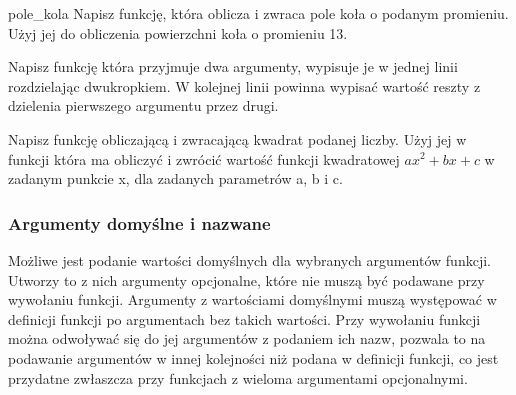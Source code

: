\documentclass{pdfBooklets}
\begin{document}
\begin{Zadanie}{}{pole_kola}
Napisz funkcję, która oblicza i zwraca pole koła o podanym promieniu. Użyj jej do obliczenia powierzchni koła o promieniu 13.

\end{Zadanie}

\begin{Zadanie}{}{}

Napisz funkcję która przyjmuje dwa argumenty, wypisuje je w jednej linii rozdzielając dwukropkiem.
W kolejnej linii powinna wypisać wartość reszty z dzielenia pierwszego argumentu przez drugi.
\end{Zadanie}

\begin{Zadanie}{}{}

Napisz funkcję obliczającą i zwracającą kwadrat podanej liczby. Użyj jej w funkcji która ma obliczyć
i zwrócić wartość funkcji kwadratowej $ax^2 + bx + c$ w zadanym punkcie x, dla zadanych parametrów a, b i c.

\end{Zadanie}

\subsubsection{Argumenty domyślne i nazwane {\Symbola 🤔}}

Możliwe jest podanie wartości domyślnych dla wybranych argumentów funkcji. Utworzy to z nich argumenty opcjonalne, które nie muszą być podawane przy wywołaniu funkcji.
Argumenty z wartościami domyślnymi muszą występować w definicji funkcji po argumentach bez takich wartości.
Przy wywołaniu funkcji można odwoływać się do jej argumentów z podaniem ich nazw, pozwala to na podawanie argumentów w innej kolejności niż podana w definicji funkcji,
co jest przydatne zwłaszcza przy funkcjach z wieloma argumentami opcjonalnymi.
\end{document}
